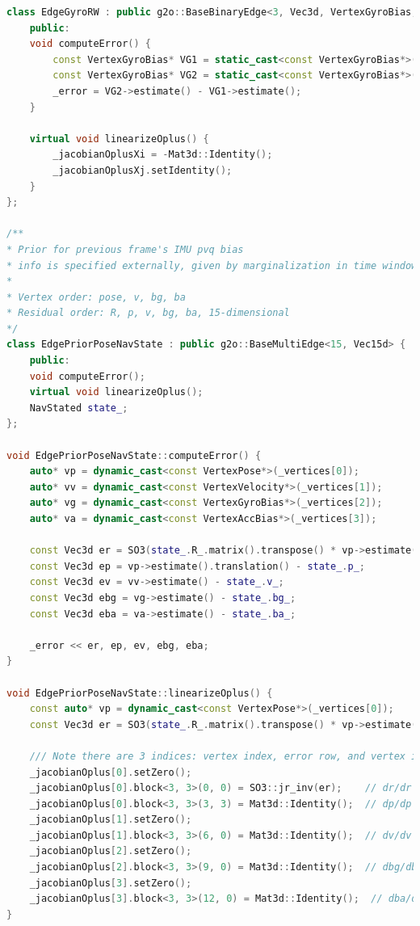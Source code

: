 \begin{lstlisting}[language=c++,caption=src/common/g2o\_types.h]
class EdgeGyroRW : public g2o::BaseBinaryEdge<3, Vec3d, VertexGyroBias, VertexGyroBias> {
	public:	
	void computeError() {
		const VertexGyroBias* VG1 = static_cast<const VertexGyroBias*>(_vertices[0]);
		const VertexGyroBias* VG2 = static_cast<const VertexGyroBias*>(_vertices[1]);
		_error = VG2->estimate() - VG1->estimate();
	}
	
	virtual void linearizeOplus() {
		_jacobianOplusXi = -Mat3d::Identity();
		_jacobianOplusXj.setIdentity();
	}
};

/**
* Prior for previous frame's IMU pvq bias
* info is specified externally, given by marginalization in time window
*
* Vertex order: pose, v, bg, ba
* Residual order: R, p, v, bg, ba, 15-dimensional
*/
class EdgePriorPoseNavState : public g2o::BaseMultiEdge<15, Vec15d> {
	public:
	void computeError();
	virtual void linearizeOplus();
	NavStated state_;
};

void EdgePriorPoseNavState::computeError() {
	auto* vp = dynamic_cast<const VertexPose*>(_vertices[0]);
	auto* vv = dynamic_cast<const VertexVelocity*>(_vertices[1]);
	auto* vg = dynamic_cast<const VertexGyroBias*>(_vertices[2]);
	auto* va = dynamic_cast<const VertexAccBias*>(_vertices[3]);
	
	const Vec3d er = SO3(state_.R_.matrix().transpose() * vp->estimate().so3().matrix()).log();
	const Vec3d ep = vp->estimate().translation() - state_.p_;
	const Vec3d ev = vv->estimate() - state_.v_;
	const Vec3d ebg = vg->estimate() - state_.bg_;
	const Vec3d eba = va->estimate() - state_.ba_;
	
	_error << er, ep, ev, ebg, eba;
}

void EdgePriorPoseNavState::linearizeOplus() {
	const auto* vp = dynamic_cast<const VertexPose*>(_vertices[0]);
	const Vec3d er = SO3(state_.R_.matrix().transpose() * vp->estimate().so3().matrix()).log();
	
	/// Note there are 3 indices: vertex index, error row, and vertex internal variable column
	_jacobianOplus[0].setZero();
	_jacobianOplus[0].block<3, 3>(0, 0) = SO3::jr_inv(er);    // dr/dr
	_jacobianOplus[0].block<3, 3>(3, 3) = Mat3d::Identity();  // dp/dp
	_jacobianOplus[1].setZero();
	_jacobianOplus[1].block<3, 3>(6, 0) = Mat3d::Identity();  // dv/dv
	_jacobianOplus[2].setZero();
	_jacobianOplus[2].block<3, 3>(9, 0) = Mat3d::Identity();  // dbg/dbg
	_jacobianOplus[3].setZero();
	_jacobianOplus[3].block<3, 3>(12, 0) = Mat3d::Identity();  // dba/dba
}


\end{lstlisting}
